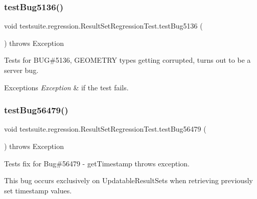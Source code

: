\subsubsection{\texorpdfstring{test\+Bug5136()}{testBug5136()}}
{\footnotesize\ttfamily void testsuite.\+regression.\+Result\+Set\+Regression\+Test.\+test\+Bug5136 (\begin{DoxyParamCaption}{ }\end{DoxyParamCaption}) throws Exception}

Tests for B\+UG\#5136, G\+E\+O\+M\+E\+T\+RY types getting corrupted, turns out to be a server bug.


\begin{DoxyExceptions}{Exceptions}
{\em Exception} & if the test fails. \\
\hline
\end{DoxyExceptions}
\mbox{\label{classtestsuite_1_1regression_1_1_result_set_regression_test_a67434549c3d855d48d611b6eff810242}} 
\subsubsection{\texorpdfstring{test\+Bug56479()}{testBug56479()}}
{\footnotesize\ttfamily void testsuite.\+regression.\+Result\+Set\+Regression\+Test.\+test\+Bug56479 (\begin{DoxyParamCaption}{ }\end{DoxyParamCaption}) throws Exception}

Tests fix for Bug\#56479 -\/ get\+Timestamp throws exception.

This bug occurs exclusively on Updatable\+Result\+Sets when retrieving previously set timestamp values. \mbox{\label{classtestsuite_1_1regression_1_1_result_set_regression_test_aaf08edff0fccda829794321f5eed7ca3}} 
